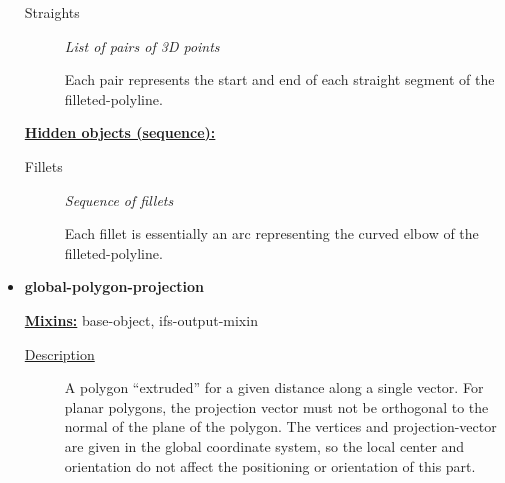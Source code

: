 \documentclass [11pt]{book}
\begin{document}
\begin{itemize}
\begin{description}
\item [Straights]
\emph{List of pairs of 3D points}

 Each pair represents the start and end of each straight segment of the
filleted-polyline.




\end{description}






\textbf{
\underline{Hidden objects (sequence):}}

\begin{description}

\item [Fillets]
\emph{Sequence of fillets}

 Each fillet is essentially an arc representing the curved elbow
of the filleted-polyline.




\end{description}







\item {}
\label{prim:global-polygon-projection}
\textbf{global-polygon-projection}


\textbf{
\underline{Mixins:}} base-object, ifs-output-mixin





\begin{description}

\item [
\underline{Description}]


A polygon ``extruded'' for a given distance along a single vector.
For planar polygons, the projection vector must not be orthogonal to the normal of the plane of
the polygon. The vertices and projection-vector are given in the global coordinate system, so
the local center and orientation do not affect the positioning or orientation of this part.



\end{description}




\begin{figure}
\begin{lrbox}{\boxedverb}
\begin{minipage}{\linewidth}
{\small

}
\end{minipage}
\end{lrbox}
\end{figure}
\end{itemize}
\end{document}
